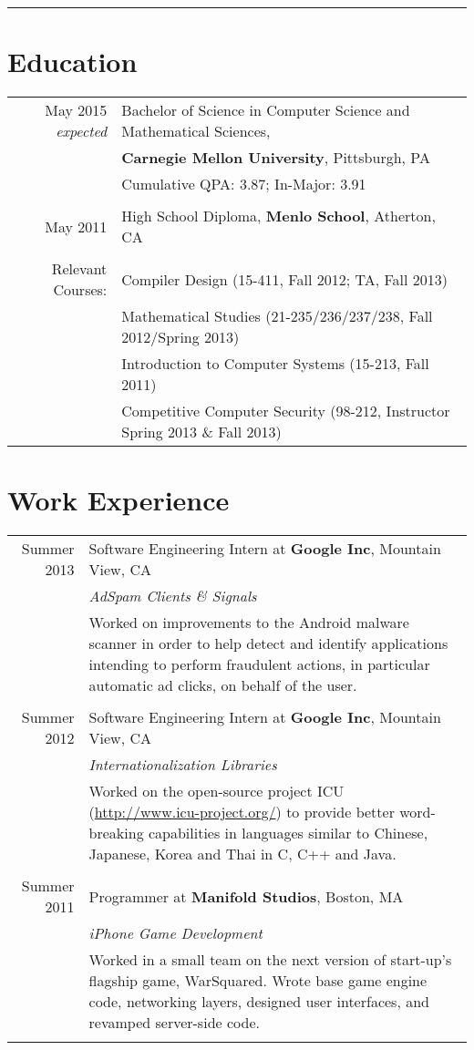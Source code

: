 \documentclass{article}
\newcommand{\job}[6]{#1 & #2 at \textbf{#3}, #4\\ & \emph{#5}\\& \footnotesize{#6}\\
    \multicolumn{2}{c}{}\\ }
\begin{document}
\pagestyle{empty}
\par{\bigskip\par}
\hrule
\par{\par}

\section{Education}
\begin{tabular}{rl}
May 2015 {\em expected} & Bachelor of Science in Computer Science and Mathematical Sciences, 
\\ & \textbf{Carnegie Mellon University}, Pittsburgh, PA\\
& Cumulative QPA: 3.87; In-Major: 3.91 \\ &\\
May 2011 & High School Diploma, \textbf{Menlo School}, Atherton, CA\\ &\\
Relevant Courses: & Compiler Design (15-411, Fall 2012; TA, Fall 2013) \\
& Mathematical Studies (21-235/236/237/238, Fall 2012/Spring 2013) \\
& Introduction to Computer Systems (15-213, Fall 2011) \\
& Competitive Computer Security (98-212, Instructor Spring 2013 \& Fall 2013)\end{tabular}

\section{Work Experience}
\begin{tabular}{r|p{}}
\job{Summer 2013}{Software Engineering Intern}{Google Inc}{Mountain View, CA}
{AdSpam Clients \& Signals}
{Worked on improvements to the Android malware scanner in order to help detect and identify
applications intending to perform fraudulent actions, in particular automatic ad clicks, on behalf
of the user.}
\job{Summer 2012}{Software Engineering Intern}{Google Inc}{Mountain View, CA}
{Internationalization Libraries}
{Worked on the open-source project ICU (\url{http://www.icu-project.org/}) to provide better
word-breaking capabilities in languages similar to Chinese, Japanese, Korea and Thai in C, C++ and
Java.}
\job{Summer 2011}{Programmer}{Manifold Studios}{Boston, MA}{iPhone Game Development}
{Worked in a small team on the next version of start-up's flagship game, WarSquared. Wrote base
game engine code, networking layers, designed user interfaces,
and revamped server-side code.}
\end{tabular}
\end{document}
